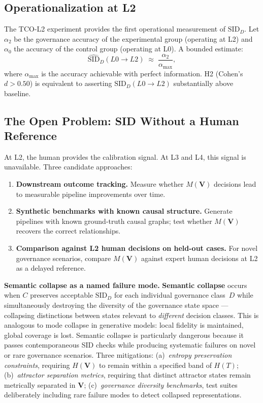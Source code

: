 \documentclass[11pt]{article}
\theoremstyle{definition}
\theoremstyle{remark}
\begin{document}
\subsection{Operationalization at L2}

The TCO-L2 experiment provides the first operational measurement of
$\text{SID}_D$. Let $\alpha_2$ be the governance accuracy of the
experimental group (operating at L2) and $\alpha_0$ the accuracy of
the control group (operating at L0). A bounded estimate:
\[
  \widehat{\mathrm{SID}}_D(L0 \to L2)
    \;\approx\; \frac{\alpha_2}{\alpha_\mathrm{max}},
\]
where $\alpha_\mathrm{max}$ is the accuracy achievable with perfect
information. H2 (Cohen's $d > 0.50$) is equivalent to asserting
$\text{SID}_D(L0 \to L2)$ substantially above baseline.

\subsection{The Open Problem: SID Without a Human Reference}
\label{sec:sid-openprob}

At L2, the human provides the calibration signal. At L3 and L4,
this signal is unavailable. Three candidate approaches:

\begin{enumerate}[leftmargin=2em]
  \item \textbf{Downstream outcome tracking.} Measure whether
    $M(\mathbf{V})$ decisions lead to measurable pipeline
    improvements over time.

  \item \textbf{Synthetic benchmarks with known causal structure.}
    Generate pipelines with known ground-truth causal graphs; test
    whether $M(\mathbf{V})$ recovers the correct relationships.

  \item \textbf{Comparison against L2 human decisions on held-out
    cases.} For novel governance scenarios, compare $M(\mathbf{V})$
    against expert human decisions at L2 as a delayed reference.
\end{enumerate}

\medskip
\noindent\textbf{Semantic collapse as a named failure mode.}
\textbf{Semantic collapse} occurs when $C$ preserves acceptable
$\text{SID}_D$ for each individual governance class~$D$ while
simultaneously destroying the diversity of the governance state
space --- collapsing distinctions between states relevant to
\emph{different} decision classes. This is analogous to mode
collapse in generative models: local fidelity is maintained, global
coverage is lost. Semantic collapse is particularly dangerous
because it passes contemporaneous SID checks while producing
systematic failures on novel or rare governance scenarios. Three
mitigations: (a)~\emph{entropy preservation constraints}, requiring
$H(\mathbf{V})$ to remain within a specified band of $H(T)$;
(b)~\emph{attractor separation metrics}, requiring that distinct
attractor states remain metrically separated in $\mathbf{V}$;
(c)~\emph{governance diversity benchmarks}, test suites deliberately
including rare failure modes to detect collapsed representations.
\end{document}
